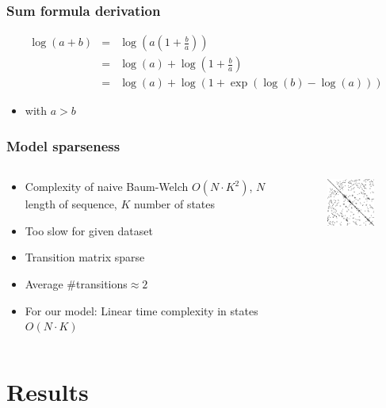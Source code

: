 \documentclass{beamer}[12pt]
\begin{document}
\begin{frame}
	\frametitle{Sum formula derivation}
	
	\begin{eqnarray*}
		\log(a+b) &=& \log\left(a(1+\frac{b}{a}) \right)\\
			&=& \log(a) + \log(1+\frac{b}{a})\\
			&=& \log(a) + \log(1+\exp\left( \log(b) - \log(a) \right))
	\end{eqnarray*}
	\begin{itemize}
		\item with $a>b$
	\end{itemize}
\end{frame}

\begin{frame}
	\frametitle{Model sparseness}
	\begin{columns}
		\begin{column}{6.5cm}
			\begin{itemize}
				\item Complexity of naive Baum-Welch $O(N\cdot K^2)$, $N$ length of sequence, $K$ number of states
				\item Too slow for given dataset
				\item Transition matrix sparse
				\item Average $\#$transitions$\approx 2$
				\item For our model: Linear time complexity in states $O(N\cdot K)$
			\end{itemize}
		\end{column}
		\begin{column}{4.5cm}
			\begin{figure}
				\includegraphics[width=4cm]{../picturesforthepresentation/sparse.png}
			\end{figure}
		\end{column}
	\end{columns}
\end{frame}

\section{Results}
\end{document}
